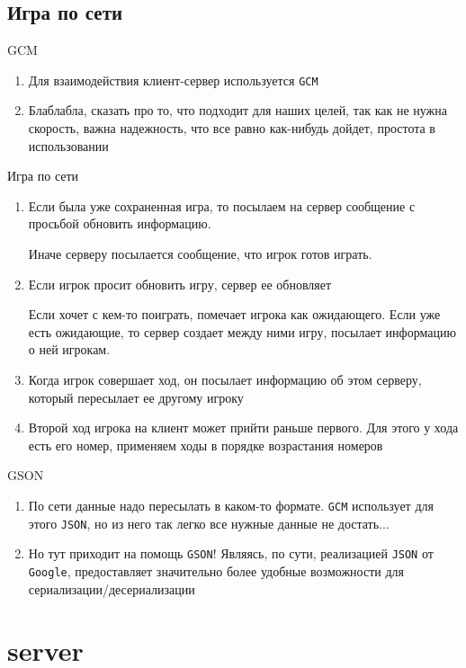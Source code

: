 \documentclass{beamer}
\def\t{\texttt}
\newcommand{\cimg}[2]{%
    \begin{center}%
        \ifthenelse{\equal{#2}{}}{%
            \texttt{[image: \#1]}
        }{%
            \texttt{[image: \#1]}
        }%
    \end{center}%
}
\begin{document}
\subsection{Игра по сети}
\begin{frame}[t]{GCM}
    \begin{enumerate}
        \item
            Для взаимодействия клиент-сервер используется \t{GCM}
                        
        \item
            Блаблабла, сказать про то, что подходит для наших целей, так как не нужна скорость, важна надежность, что все равно как-нибудь дойдет, простота в использовании
    \end{enumerate}
\end{frame}
\begin{frame}[t]{Игра по сети}
    \begin{enumerate}
        \item
            Если была уже сохраненная игра, то посылаем на сервер сообщение с просьбой обновить информацию.
                
            Иначе серверу посылается сообщение, что игрок готов играть.
        \pause
        \item
            Если игрок просит обновить игру, сервер ее обновляет

            Если хочет с кем-то поиграть, помечает игрока как ожидающего. Если уже есть ожидающие, то сервер создает между ними игру, посылает информацию о ней игрокам.
        \pause
        \item
            Когда игрок совершает ход, он посылает информацию об этом серверу, который пересылает ее другому игроку
        \pause
        \item
            Второй ход игрока на клиент может прийти раньше первого. Для этого у хода есть его номер, применяем ходы в порядке возрастания номеров
    \end{enumerate}
\end{frame}
\begin{frame}[t]{GSON}
    \begin{enumerate}
        \item
            По сети данные надо пересылать в каком-то формате. \t{GCM} использует для этого \t{JSON}, но из него так легко все нужные данные не достать...
            \cimg{02.png}{1.0}
        \pause
        \item
            Но тут приходит на помощь \t{GSON}! Являясь, по сути, реализацией \t{JSON} от \t{Google}, %
            предоставляет значительно более удобные возможности для сериализации/десериализации
            \cimg{03.png}{1.0}

    \end{enumerate}
\end{frame}
\section{server}
\end{document}
